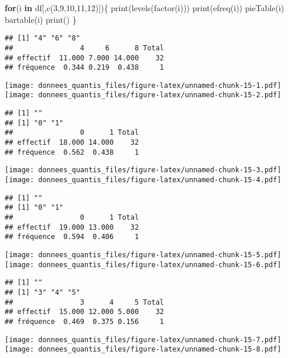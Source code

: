 \documentclass[
]{article}
\newenvironment{Shaded}{\begin{snugshade}}{\end{snugshade}}
\newcommand{\ControlFlowTok}[1]{\textcolor[rgb]{0.13,0.29,0.53}{\textbf{#1}}}
\newcommand{\DecValTok}[1]{\textcolor[rgb]{0.00,0.00,0.81}{#1}}
\newcommand{\FunctionTok}[1]{\textcolor[rgb]{0.00,0.00,0.00}{#1}}
\newcommand{\NormalTok}[1]{#1}
\newcommand{\StringTok}[1]{\textcolor[rgb]{0.31,0.60,0.02}{#1}}
\begin{document}
\begin{Shaded}
\begin{Highlighting}[]
\ControlFlowTok{for}\NormalTok{(i }\ControlFlowTok{in}\NormalTok{ df[,}\FunctionTok{c}\NormalTok{(}\DecValTok{3}\NormalTok{,}\DecValTok{9}\NormalTok{,}\DecValTok{10}\NormalTok{,}\DecValTok{11}\NormalTok{,}\DecValTok{12}\NormalTok{)])\{}
  \FunctionTok{print}\NormalTok{(}\FunctionTok{levels}\NormalTok{(}\FunctionTok{factor}\NormalTok{(i)))}
  \FunctionTok{print}\NormalTok{(}\FunctionTok{efreq}\NormalTok{(i))}
  \FunctionTok{pieTable}\NormalTok{(i)}
  \FunctionTok{bartable}\NormalTok{(i)}
  \FunctionTok{print}\NormalTok{(}\StringTok{\textquotesingle{}\textquotesingle{}}\NormalTok{)}
\NormalTok{\}}
\end{Highlighting}
\end{Shaded}

\begin{verbatim}
## [1] "4" "6" "8"
##                4     6      8 Total
## effectif  11.000 7.000 14.000    32
## fréquence  0.344 0.219  0.438     1
\end{verbatim}

\texttt{[image: donnees\_quantis\_files/figure-latex/unnamed-chunk-15-1.pdf]}
\texttt{[image: donnees\_quantis\_files/figure-latex/unnamed-chunk-15-2.pdf]}

\begin{verbatim}
## [1] ""
## [1] "0" "1"
##                0      1 Total
## effectif  18.000 14.000    32
## fréquence  0.562  0.438     1
\end{verbatim}

\texttt{[image: donnees\_quantis\_files/figure-latex/unnamed-chunk-15-3.pdf]}
\texttt{[image: donnees\_quantis\_files/figure-latex/unnamed-chunk-15-4.pdf]}

\begin{verbatim}
## [1] ""
## [1] "0" "1"
##                0      1 Total
## effectif  19.000 13.000    32
## fréquence  0.594  0.406     1
\end{verbatim}

\texttt{[image: donnees\_quantis\_files/figure-latex/unnamed-chunk-15-5.pdf]}
\texttt{[image: donnees\_quantis\_files/figure-latex/unnamed-chunk-15-6.pdf]}

\begin{verbatim}
## [1] ""
## [1] "3" "4" "5"
##                3      4     5 Total
## effectif  15.000 12.000 5.000    32
## fréquence  0.469  0.375 0.156     1
\end{verbatim}

\texttt{[image: donnees\_quantis\_files/figure-latex/unnamed-chunk-15-7.pdf]}
\texttt{[image: donnees\_quantis\_files/figure-latex/unnamed-chunk-15-8.pdf]}
\end{document}
